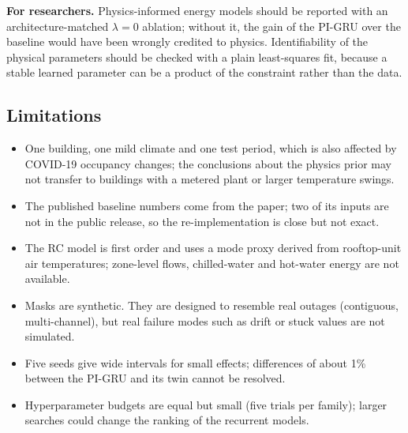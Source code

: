 \textbf{For researchers.} Physics-informed energy models should be reported with an architecture-matched $\lambda=0$ ablation; without it, the gain of the PI-GRU over the baseline would have been wrongly credited to physics. Identifiability of the physical parameters should be checked with a plain least-squares fit, because a stable learned parameter can be a product of the constraint rather than the data.

\subsection{Limitations}\label{sec:limits}
\begin{itemize}[nosep]
\item One building, one mild climate and one test period, which is also affected by COVID-19 occupancy changes; the conclusions about the physics prior may not transfer to buildings with a metered plant or larger temperature swings.
\item The published baseline numbers come from the paper; two of its inputs are not in the public release, so the re-implementation is close but not exact.
\item The RC model is first order and uses a mode proxy derived from rooftop-unit air temperatures; zone-level flows, chilled-water and hot-water energy are not available.
\item Masks are synthetic. They are designed to resemble real outages (contiguous, multi-channel), but real failure modes such as drift or stuck values are not simulated.
\item Five seeds give wide intervals for small effects; differences of about 1\% between the PI-GRU and its twin cannot be resolved.
\item Hyperparameter budgets are equal but small (five trials per family); larger searches could change the ranking of the recurrent models.
\end{itemize}
